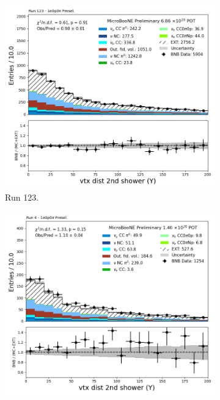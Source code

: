 \begin{figure}[H]
    \centering
    \begin{subfigure}[t]{0.32\linewidth}
        \includegraphics[width=\linewidth]{technote/Appendix_Preselection/Figures/1e0p0pi/Run123/secondshower_Y_vtxdist_Run123_1e0p0pi_Presel.png}
        \caption{Run 123.}
    \end{subfigure}%
    \hspace{0.2cm}%
    \begin{subfigure}[t]{0.32\linewidth}
        \includegraphics[width=\linewidth]{technote/Appendix_Preselection/Figures/1e0p0pi/Run4b/secondshower_Y_vtxdist_Run4b_1e0p0pi_Presel.png}

\end{subfigure}
\end{figure}
